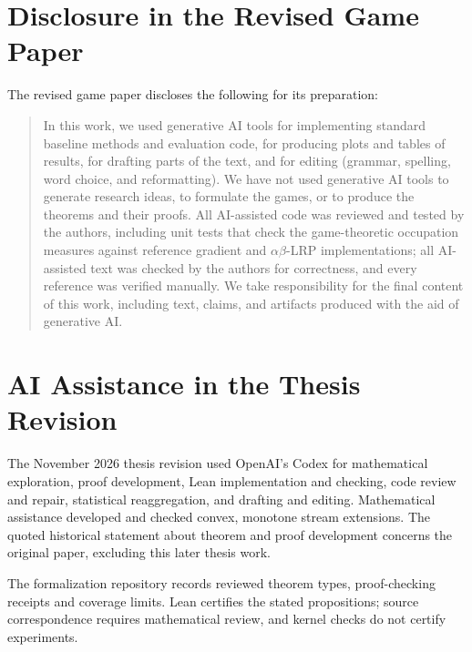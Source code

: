 \section{Disclosure in the Revised Game Paper}
The revised game paper discloses the following for its preparation:
\begin{quote}
In this work, we used generative AI tools for implementing standard baseline methods and evaluation
code, for producing plots and tables of results, for drafting parts of the text, and for editing
(grammar, spelling, word choice, and reformatting).
We have not used generative AI tools to generate research ideas, to formulate the games, or to
produce the theorems and their proofs.
All AI-assisted code was reviewed and tested by the authors, including unit tests that check the
game-theoretic occupation measures against reference gradient and $\alpha\beta$-LRP
implementations; all AI-assisted text was checked by the authors for correctness, and every
reference was verified manually.
We take responsibility for the final content of this work, including text, claims, and artifacts
produced with the aid of generative AI.
\end{quote}

\section{AI Assistance in the Thesis Revision}
The November 2026 thesis revision used OpenAI's Codex for mathematical exploration, proof development, Lean implementation and checking, code review and repair, statistical reaggregation, and drafting and editing. Mathematical assistance developed and checked convex, monotone stream extensions. The quoted historical statement about theorem and proof development concerns the original paper, excluding this later thesis work.

The formalization repository records reviewed theorem types, proof-checking receipts and coverage limits. Lean certifies the stated propositions; source correspondence requires mathematical review, and kernel checks do not certify experiments.
